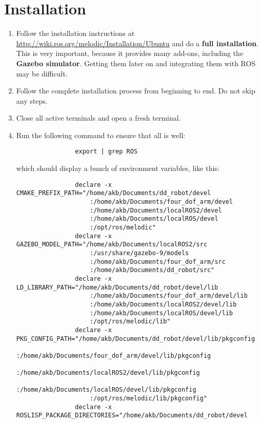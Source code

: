 \documentclass{article}
\begin{document}
    \section{Installation}
        \begin{enumerate}
            \item Follow the installation instructions at \url{http://wiki.ros.org/melodic/Installation/Ubuntu}
            and do a \textbf{full installation}. This is very important, because it provides 
            many add-ons, including the \textbf{Gazebo simulator}. Getting them 
            later on and integrating them with ROS may be difficult.
            \item Follow the complete installation process from beginning to end. Do not skip any steps.
            \item Close all active terminals and open a fresh terminal.
            \item Run the following command to ensure that all is well:
            \begin{verbatim}
                export | grep ROS
            \end{verbatim}
            which should display a bunch of environment variables, like this:
            \begin{verbatim}
                declare -x CMAKE_PREFIX_PATH="/home/akb/Documents/dd_robot/devel
                    :/home/akb/Documents/four_dof_arm/devel
                    :/home/akb/Documents/localROS2/devel
                    :/home/akb/Documents/localROS/devel
                    :/opt/ros/melodic"
                declare -x GAZEBO_MODEL_PATH="/home/akb/Documents/localROS2/src
                    :/usr/share/gazebo-9/models
                    :/home/akb/Documents/four_dof_arm/src
                    :/home/akb/Documents/dd_robot/src"
                declare -x LD_LIBRARY_PATH="/home/akb/Documents/dd_robot/devel/lib
                    :/home/akb/Documents/four_dof_arm/devel/lib
                    :/home/akb/Documents/localROS2/devel/lib
                    :/home/akb/Documents/localROS/devel/lib
                    :/opt/ros/melodic/lib"
                declare -x PKG_CONFIG_PATH="/home/akb/Documents/dd_robot/devel/lib/pkgconfig
                    :/home/akb/Documents/four_dof_arm/devel/lib/pkgconfig
                    :/home/akb/Documents/localROS2/devel/lib/pkgconfig
                    :/home/akb/Documents/localROS/devel/lib/pkgconfig
                    :/opt/ros/melodic/lib/pkgconfig"
                declare -x ROSLISP_PACKAGE_DIRECTORIES="/home/akb/Documents/dd_robot/devel

\end{verbatim}
\end{enumerate}
\end{document}
